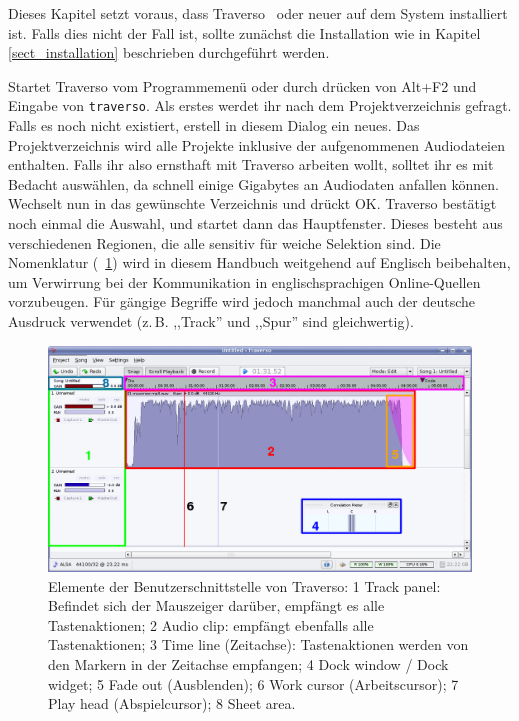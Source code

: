 Dieses Kapitel setzt voraus, dass Traverso \Version\ oder neuer auf dem System installiert ist. Falls dies nicht der Fall ist, sollte zunächst die Installation wie in Kapitel \ref{sect_installation} beschrieben durchgeführt werden.

Startet Traverso vom Programmemenü oder durch drücken von Alt+F2 und Eingabe von \texttt{traverso}. Als erstes werdet ihr nach dem Projektverzeichnis gefragt. Falls es noch nicht existiert, erstell in diesem Dialog ein neues. Das Projektverzeichnis wird alle Projekte inklusive der aufgenommenen Audiodateien enthalten. Falls ihr also ernsthaft mit Traverso arbeiten wollt, solltet ihr es mit Bedacht auswählen, da schnell einige Gigabytes an Audiodaten anfallen können. Wechselt nun in das gewünschte Verzeichnis und drückt OK. Traverso bestätigt noch einmal die Auswahl, und startet dann das Hauptfenster. Dieses besteht aus verschiedenen Regionen, die alle sensitiv für weiche Selektion sind. Die Nomenklatur (\FigB\ \ref{fig_gui01}) wird in diesem Handbuch weitgehend auf Englisch beibehalten, um Verwirrung bei der Kommunikation in englischsprachigen Online-Quellen vorzubeugen. Für gängige Begriffe wird jedoch manchmal auch der deutsche Ausdruck verwendet (z.\,B. ,,Track'' und ,,Spur'' sind gleichwertig).

\begin{figure}
 \centering\includegraphics[width=\textwidth]{images/sshot06.png}
 \caption{Elemente der Benutzerschnittstelle von Traverso: 1 Track panel: Befindet sich der Mauszeiger darüber, empfängt es alle Tastenaktionen; 2 Audio clip: empfängt ebenfalls alle Tastenaktionen; 3 Time line (Zeitachse): Tastenaktionen werden von den Markern in der Zeitachse empfangen; 4 Dock window / Dock widget; 5 Fade out (Ausblenden); 6 Work cursor (Arbeitscursor); 7 Play head (Abspielcursor); 8 Sheet area.}
 \label{fig_gui01}
\end{figure}


